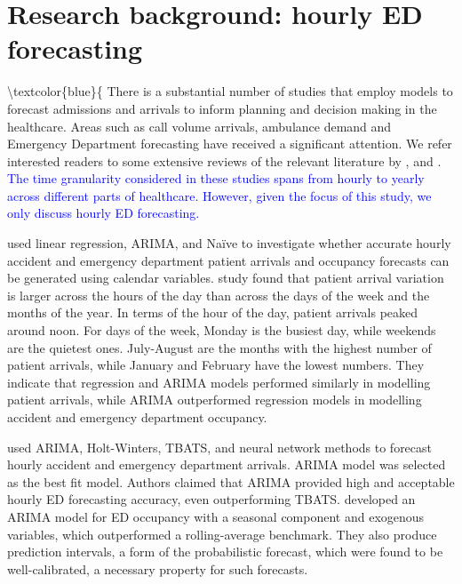 \documentclass[]{elsarticle} %
\begin{document}
\hypertarget{lit}{%
\section{Research background: hourly ED forecasting}\label{lit}}

\textbackslash textcolor\{blue\}\{
There is a substantial number of studies that employ models to forecast admissions and arrivals to inform planning and decision making in the healthcare. Areas such as call volume arrivals, ambulance demand and Emergency Department forecasting have received a significant attention. We refer interested readers to some extensive reviews of the relevant literature by \citet{mingliterature2022}, \citet{gul2020review} and \citet{ibrahim2016modeling}. \textcolor{blue}{The time granularity considered in these studies spans from hourly to yearly across different parts of healthcare. However, given the focus of this study, we only discuss hourly ED forecasting.}

\citet{hertzum2017forecasting} used linear regression, ARIMA, and Naïve to
investigate whether accurate hourly accident and emergency department
patient arrivals and occupancy forecasts can be generated using calendar
variables. \citet{hertzum2017forecasting} study found that patient arrival
variation is larger across the hours of the day than across the days of
the week and the months of the year. In terms of the hour of the day,
patient arrivals peaked around noon. For days of the week, Monday is the
busiest day, while weekends are the quietest ones. July-August are the
months with the highest number of patient arrivals, while January and
February have the lowest numbers. They indicate that regression and
ARIMA models performed similarly in modelling patient arrivals, while
ARIMA outperformed regression models in modelling accident and emergency
department occupancy.

\citet{choudhury2020forecasting} used ARIMA, Holt-Winters, TBATS, and neural
network methods to forecast hourly accident and emergency department
arrivals. ARIMA model was selected as the best fit model. Authors
claimed that ARIMA provided high and acceptable hourly ED forecasting
accuracy, even outperforming TBATS. \citet{Cheng2021} developed an ARIMA model
for ED occupancy with a seasonal component and exogenous variables,
which outperformed a rolling-average benchmark. They also produce
prediction intervals, a form of the probabilistic forecast, which were
found to be well-calibrated, a necessary property for such forecasts.
\end{document}
